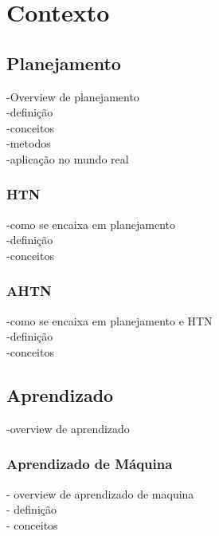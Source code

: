 \chapter{\label{chap:conte}Contexto}


\cite{meneguzzi2015planning}
\cite{ontanon2015adversarial}
\cite{ontanon2012experiments}
\cite{intelligence2003modern}
\cite{buro2003real}
\cite{hogg2010learning} 

\section{Planejamento} 
-Overview de planejamento \\
-definição \\
-conceitos \\
-metodos \\
-aplicação no mundo real

\subsection{HTN} 
-como se encaixa em planejamento \\ 
-definição \\
-conceitos \\

\subsection{AHTN} 
-como se encaixa em planejamento e HTN \\
-definição \\
-conceitos

\section{Aprendizado} 
-overview de aprendizado

\subsection{Aprendizado de Máquina} 
- overview de aprendizado de maquina \\
- definição \\
- conceitos
